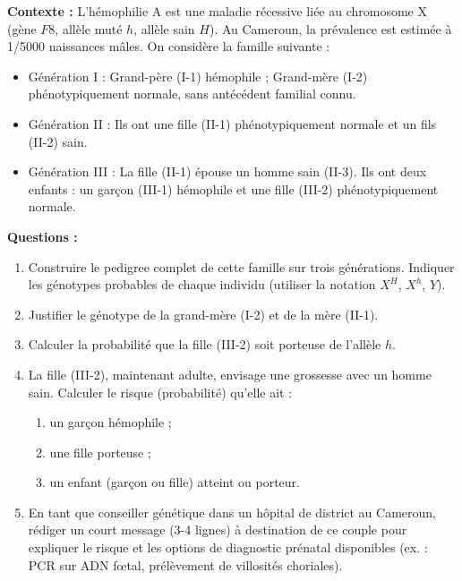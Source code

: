 \documentclass[11pt]{article}
\begin{document}
\begin{exercice}
\textbf{Contexte :} L'hémophilie A est une maladie récessive liée au chromosome X (gène $F8$, allèle muté $h$, allèle sain $H$). Au Cameroun, la prévalence est estimée à 1/5000 naissances mâles.
On considère la famille suivante :
\begin{itemize}
    \item Génération I : Grand-père (I-1) hémophile ; Grand-mère (I-2) phénotypiquement normale, sans antécédent familial connu.
    \item Génération II : Ils ont une fille (II-1) phénotypiquement normale et un fils (II-2) sain.
    \item Génération III : La fille (II-1) épouse un homme sain (II-3). Ils ont deux enfants : un garçon (III-1) hémophile et une fille (III-2) phénotypiquement normale.
\end{itemize}
\textbf{Questions :}
\begin{enumerate}
    \item Construire le pedigree complet de cette famille sur trois générations. Indiquer les génotypes probables de chaque individu (utiliser la notation $X^H$, $X^h$, $Y$).
    \item Justifier le génotype de la grand-mère (I-2) et de la mère (II-1).
    \item Calculer la probabilité que la fille (III-2) soit porteuse de l'allèle $h$.
    \item La fille (III-2), maintenant adulte, envisage une grossesse avec un homme sain. Calculer le risque (probabilité) qu'elle ait :
    \begin{enumerate}
        \item un garçon hémophile ;
        \item une fille porteuse ;
        \item un enfant (garçon ou fille) atteint ou porteur.
    \end{enumerate}
    \item En tant que conseiller génétique dans un hôpital de district au Cameroun, rédiger un court message (3-4 lignes) à destination de ce couple pour expliquer le risque et les options de diagnostic prénatal disponibles (ex. : PCR sur ADN fœtal, prélèvement de villosités choriales).
\end{enumerate}
\end{exercice}
\end{document}
